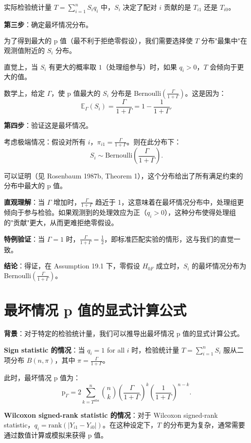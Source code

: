 实际检验统计量 $T = \sum_{i=1}^n S_i q_i$ 中，$S_i$ 决定了配对 $i$ 贡献的是 $T_{i1}$ 还是 $T_{i0}$。

\textbf{第三步}：确定最坏情况分布。

为了得到最大的 p 值（最不利于拒绝零假设），我们需要选择使 $T$ 分布"最集中"在观测值附近的 $S_i$ 分布。

直觉上，当 $S_i$ 有更大的概率取 $1$（处理组参与）时，如果 $q_i > 0$，$T$ 会倾向于更大的值。

数学上，给定 $\Gamma$，使 p 值最大的 $S_i$ 分布是 Bernoulli$\left(\frac{\Gamma}{1+\Gamma}\right)$。这是因为：
\[
\mathbb{E}_{\Gamma}(S_i) = \frac{\Gamma}{1+\Gamma} = 1 - \frac{1}{1+\Gamma}.
\]

\textbf{第四步}：验证这是最坏情况。

考虑极端情况：假设对所有 $i$，$\pi_{i1} = \frac{\Gamma}{1+\Gamma}$。则在此分布下：
\[
S_i \sim \text{Bernoulli}\left(\frac{\Gamma}{1+\Gamma}\right).
\]

可以证明（见 Rosenbaum 1987b, Theorem 1），这个分布给出了所有满足约束的分布中最大的 p 值。

\textbf{直观理解}：当 $\Gamma$ 增加时，$\frac{\Gamma}{1+\Gamma}$ 趋近于 1，这意味着在最坏情况分布中，处理组更倾向于参与检验。如果观测到的处理效应为正（$q_i > 0$），这种分布使得处理组的"贡献"更大，从而更难拒绝零假设。

\textbf{特例验证}：当 $\Gamma = 1$ 时，$\frac{\Gamma}{1+\Gamma} = \frac{1}{2}$，即标准匹配实验的情形，这与我们的直觉一致。

\textbf{结论}：得证，在 Assumption 19.1 下，零假设 $H_{0F}$ 成立时，$S_i$ 的最坏情况分布为 Bernoulli$\left(\frac{\Gamma}{1+\Gamma}\right)$。

\section{最坏情况 p 值的显式计算公式}\label{sec:appendix-19-pvalue-formula}

\textbf{背景}：对于特定的检验统计量，我们可以推导出最坏情况 p 值的显式计算公式。

\textbf{Sign statistic 的情况}：当 $q_i = 1$ for all $i$ 时，检验统计量 $T = \sum_{i=1}^n S_i$ 服从二项分布 $B(n, \pi)$，其中 $\pi = \frac{\Gamma}{1+\Gamma}$。

此时，最坏情况 p 值为：
\[
\text{p}_{\Gamma} = 2 \sum_{k=T^{\mathrm{obs}}}^n \binom{n}{k} \left(\frac{\Gamma}{1+\Gamma}\right)^k \left(\frac{1}{1+\Gamma}\right)^{n-k}.
\]

\textbf{Wilcoxon signed-rank statistic 的情况}：对于 Wilcoxon signed-rank statistic，$q_i = \text{rank}(|Y_{i1} - Y_{i0}|)$。在这种设定下，$T$ 的分布更为复杂，通常需要通过数值计算或模拟来获得 p 值。

